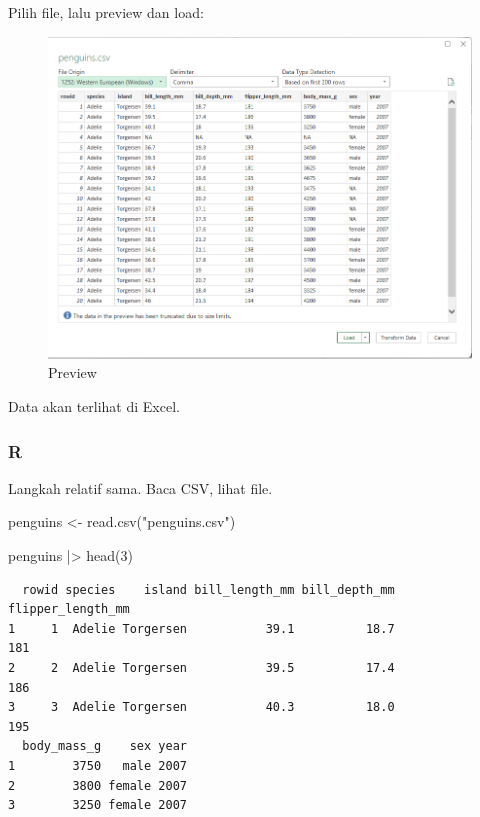 \documentclass[
  letterpaper,
  DIV=11,
  numbers=noendperiod]{scrreprt}
\newenvironment{Shaded}{\begin{snugshade}}{\end{snugshade}}
\newcommand{\DecValTok}[1]{\textcolor[rgb]{0.68,0.00,0.00}{#1}}
\newcommand{\FunctionTok}[1]{\textcolor[rgb]{0.28,0.35,0.67}{#1}}
\newcommand{\NormalTok}[1]{\textcolor[rgb]{0.00,0.23,0.31}{#1}}
\newcommand{\OtherTok}[1]{\textcolor[rgb]{0.00,0.23,0.31}{#1}}
\newcommand{\SpecialCharTok}[1]{\textcolor[rgb]{0.37,0.37,0.37}{#1}}
\newcommand{\StringTok}[1]{\textcolor[rgb]{0.13,0.47,0.30}{#1}}
\begin{document}
Pilih file, lalu preview dan load:

\begin{figure}

{\centering \includegraphics{./step0-preview.png}

}

\caption{Preview}

\end{figure}

Data akan terlihat di Excel.

\hypertarget{r-1}{%
\subsubsection{R}\label{r-1}}

Langkah relatif sama. Baca CSV, lihat file.

\begin{Shaded}
\begin{Highlighting}[]
\NormalTok{penguins }\OtherTok{\textless{}{-}} \FunctionTok{read.csv}\NormalTok{(}\StringTok{"penguins.csv"}\NormalTok{)}

\NormalTok{penguins }\SpecialCharTok{|\textgreater{}} \FunctionTok{head}\NormalTok{(}\DecValTok{3}\NormalTok{)}
\end{Highlighting}
\end{Shaded}

\begin{verbatim}
  rowid species    island bill_length_mm bill_depth_mm flipper_length_mm
1     1  Adelie Torgersen           39.1          18.7               181
2     2  Adelie Torgersen           39.5          17.4               186
3     3  Adelie Torgersen           40.3          18.0               195
  body_mass_g    sex year
1        3750   male 2007
2        3800 female 2007
3        3250 female 2007
\end{verbatim}
\end{document}
